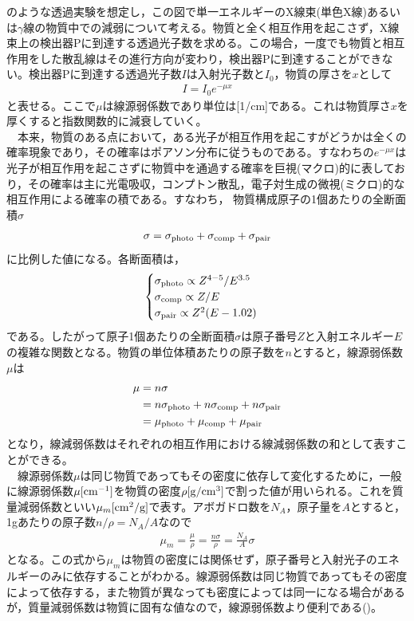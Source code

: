 のような透過実験を想定し，この図で単一エネルギーのX線束(単色X線)あるいは$\gamma$線の物質中での減弱について考える。物質と全く相互作用を起こさず，X線束上の検出器Pに到達する透過光子数を求める。この場合，一度でも物質と相互作用をした散乱線はその進行方向が変わり，検出器Pに到達することができない。検出器Pに到達する透過光子数$I$は入射光子数と$I_0$，物質の厚さを$x$として
\begin{align}
I=I_0e^{-\mu x} \label{eq:atten}
\end{align}
と表せる。ここで$\mu$は線源弱係数であり単位は[1/cm]である。これは物質厚さ$x$を厚くすると指数関数的に減衰していく。\\
\ \ 本来，物質のある点において，ある光子が相互作用を起こすがどうかは全くの確率現象であり，その確率はポアソン分布に従うものである。すなわちの$e^{-\mu x}$は光子が相互作用を起こさずに物質中を通過する確率を巨視(マクロ)的に表しており，その確率は主に光電吸収，コンプトン散乱，電子対生成の微視(ミクロ)的な相互作用による確率の積である。すなわち，
物質構成原子の1個あたりの全断面積$\sigma$
\begin{align}
\sigma=\sigma_{\rm photo}+\sigma_{\rm comp}+\sigma_{\rm pair} \label{eq:sigma_all}
\end{align}
に比例した値になる。各断面積は，
\begin{align}
\begin{cases}
\sigma_{\rm photo}\propto Z^{4-5}/E^{3.5}\\
\sigma_{\rm comp}\propto Z/E\\
\sigma_{\rm pair}\propto Z^2(E-1.02)
\end{cases}
\end{align}
である。したがって原子1個あたりの全断面積$\sigma$は原子番号$Z$と入射エネルギー$E$の複雑な関数となる。物質の単位体積あたりの原子数を$n$とすると，線源弱係数$\mu$は
\begin{align}
\mu&=n\sigma \\
&=n\sigma_{\rm photo}+n\sigma_{\rm comp}+n\sigma_{\rm pair}\\
&=\mu_{\rm photo}+\mu_{\rm comp}+\mu_{\rm pair}
\end{align}
となり，線減弱係数はそれぞれの相互作用における線減弱係数の和として表すことができる。\\
\ \ 線源弱係数$\mu$は同じ物質であってもその密度に依存して変化するために，一般に線源弱係数$\mu[\rm cm^{-1}]$を物質の密度$\rho[\rm g/cm^{3}]$で割った値が用いられる。これを質量減弱係数といい$\mu_m[\rm cm^2/g]$で表す。アボガドロ数を$N_A$，原子量を$A$とすると，1gあたりの原子数$n/\rho=N_A/A$なので%
\begin{align}
\mu_m=\frac{\mu}{\rho}=\frac{n\sigma}{\rho}=\frac{N_A}{A}\sigma \label{eq:mass_atten}
\end{align}
となる。この式から$\mu_m$は物質の密度には関係せず，原子番号と入射光子のエネルギーのみに依存することがわかる。線源弱係数は同じ物質であってもその密度によって依存する，また物質が異なっても密度によっては同一になる場合があるが，質量減弱係数は物質に固有な値なので，線源弱係数より便利である()。

